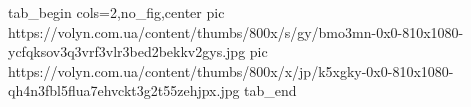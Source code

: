  
 
 
 
 


\ifcmt
  tab_begin cols=2,no_fig,center
     pic https://volyn.com.ua/content/thumbs/800x/s/gy/bmo3mn-0x0-810x1080-ycfqksov3q3vrf3vlr3bed2bekkv2gys.jpg
		 pic https://volyn.com.ua/content/thumbs/800x/x/jp/k5xgky-0x0-810x1080-qh4n3fbl5flua7ehvckt3g2t55zehjpx.jpg
  tab_end
\fi
